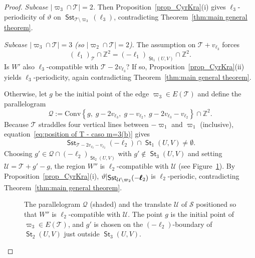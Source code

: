 \documentclass[12pt]{amsart}
\numberwithin{equation}{section}
\DeclareMathOperator{\st}{\mathsf{St}}
\DeclareMathOperator{\sst}{\mathsf{Sst}}
\newcommand{\bb}[1]{\mathbb{#1}}
\newcommand{\sob}[1]{\ensuremath{{\mathbin |}\raise-.4ex\hbox{$#1$}}}
\begin{document}
\begin{proof}
\smallskip
\textit{Subcase $|\varpi_3 \cap \mathcal{T}| = 2$.} Then
Proposition~\ref{prop_CyrKra}(i) gives $\ell_3$-periodicity of $\vartheta$
on $\sst_{\mathcal{T}\setminus\varpi_3}(\pmb{\ell}_3)$, contradicting
Theorem~\ref{thm:main general theorem}.

\smallskip
\textit{Subcase $|\varpi_3 \cap \mathcal{T}| = 3$ (so $|\varpi_2 \cap
\mathcal{T}| = 2$).} The assumption on
$\mathcal{T}+v_{\pmb{\ell}_3}$ forces
\begin{equation}\label{eq:position of T - caso m=3(b)}
    (\pmb{\ell}_1)_{\mathcal{T}} \cap \bb{Z}^2
    = (-\pmb{\ell}_{1})_{\st_1(U,V)} \cap \bb{Z}^2.
\end{equation}
Is $W'$ also $\pmb{\ell}_3$-compatible with $\mathcal{T}-2v_{\pmb
{\ell}_3}$? If so, Proposition~\ref{prop_CyrKra}(ii) yields $\ell_3$-periodicity,
again contradicting Theorem~\ref{thm:main general theorem}.

Otherwise, let $ g $ be the initial point of the edge $\varpi_3 \in E(\mathcal{T})$ and define
the parallelogram
\[
\mathcal{Q} := \mathrm{Conv}\!\left\{
g,\;
g-2v_{\pmb{\ell}_3},\;
g-v_{\pmb{\ell}_2},\;
g-2v_{\pmb{\ell}_3}-v_{\pmb{\ell}_2}
\right\} \cap \bb{Z}^2.
\]
Because $\mathcal{T}$ straddles four vertical lines between $-\varpi_1$
and $\varpi_1$ (inclusive), equation~\eqref{eq:position of T - caso m=3(b)} gives
\[
\sst_{\mathcal{T}-2v_{\pmb{\ell}_3}-v_{\pmb{\ell}_2}}(-\pmb{\ell}_2)
\cap \st_1(U,V) \neq \emptyset.
\]
Choosing $g' \in \mathcal{Q} \cap (-\pmb{\ell}_2)_{\st_2(U,V)}$
with $g' \notin \st_3(U,V)$ and setting $\mathcal{U} = \mathcal{T}
+g'-g$, the region $W''$ is $\pmb{\ell}_2$-compatible with
$\mathcal{U}$ (see Figure~\ref{fig6}). By Proposition~\ref{prop_CyrKra}(i), $\vartheta\sob{\sst_{\mathcal{U} \setminus\varpi_2}(-\pmb{\ell}_2)}$ is $\ell_2$-periodic, contradicting Theorem~\ref{thm:main general theorem}.

\begin{figure}[ht]
    \centering
    \def\svgwidth{5cm}
    \caption{The parallelogram $\mathcal{Q}$ (shaded) and the translate $\mathcal{U}$ of $\mathcal{S}$ positioned so that $W''$ is
    $\pmb{\ell}_2$-compatible with $\mathcal{U}$. The point $g$ is the initial point of $\varpi_3 \in E(\mathcal{T})$, and $g'$ is chosen on the $(-\pmb{\ell}_2)$-boundary of $\st_2(U,V)$ just outside $\st_3(U,V)$.}
    \label{fig6}
\end{figure}


\end{proof}
\end{document}
